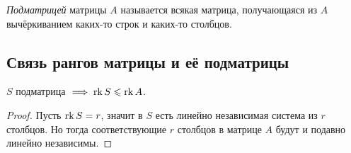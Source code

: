\begin{definition}
    \textit{Подматрицей} матрицы $A$ называется всякая матрица, получающаяся из $A$ вычёркиванием каких-то строк и каких-то столбцов.
\end{definition}


\subsection{Связь рангов матрицы и её подматрицы}

\begin{proposal}
    $S$ подматрица $\implies \operatorname{\mathop{\mathrm{rk}}} S \leqslant \operatorname{\mathop{\mathrm{rk}}} A$.
\end{proposal}

\begin{proof}
    Пусть $\operatorname{\mathop{\mathrm{rk}}} S = r$, значит в $S$ есть линейно независимая система из $r$ столбцов.
    Но тогда соответствующие $r$ столбцов в матрице $A$ будут и подавно линейно независимы.
\end{proof}
